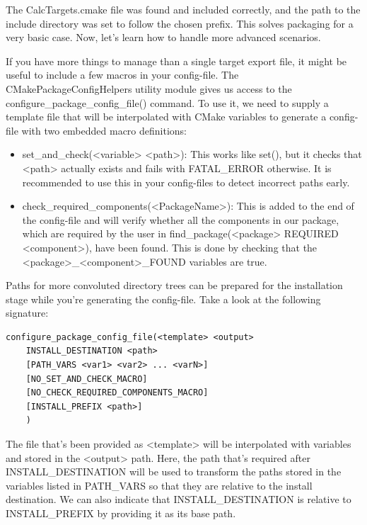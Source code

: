 The CalcTargets.cmake file was found and included correctly, and the path to the include directory was set to follow the chosen prefix. This solves packaging for a very basic case. Now, let's learn how to handle more advanced scenarios.


If you have more things to manage than a single target export file, it might be useful to include a few macros in your config-file. The CMakePackageConfigHelpers utility module gives us access to the configure\_package\_config\_file() command. To use it, we need to supply a template file that will be interpolated with CMake variables to generate a config-file with two embedded macro definitions:

\begin{itemize}
\item 
set\_and\_check(<variable> <path>): This works like set(), but it checks that <path> actually exists and fails with FATAL\_ERROR otherwise. It is recommended to use this in your config-files to detect incorrect paths early.

\item 
check\_required\_components(<PackageName>): This is added to the end of the config-file and will verify whether all the components in our package, which are required by the user in find\_package(<package> REQUIRED <component>), have been found. This is done by checking that the <package>\_<component>\_FOUND variables are true.
\end{itemize}

Paths for more convoluted directory trees can be prepared for the installation stage while you're generating the config-file. Take a look at the following signature:

\begin{lstlisting}[style=styleCMake]
configure_package_config_file(<template> <output>
	INSTALL_DESTINATION <path>
	[PATH_VARS <var1> <var2> ... <varN>]
	[NO_SET_AND_CHECK_MACRO]
	[NO_CHECK_REQUIRED_COMPONENTS_MACRO]
	[INSTALL_PREFIX <path>]
	)
\end{lstlisting}

The file that's been provided as <template> will be interpolated with variables and stored in the <output> path. Here, the path that's required after INSTALL\_DESTINATION will be used to transform the paths stored in the variables listed in PATH\_VARS so that they are relative to the install destination. We can also indicate that INSTALL\_DESTINATION is relative to INSTALL\_PREFIX by providing it as its base path.

